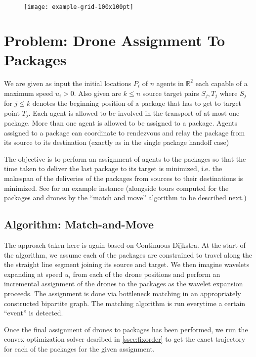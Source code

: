 \documentclass[10pt, english, oneside]{report}
\begin{document}
\begin{figure}[H]
\centering
\texttt{[image: example-grid-100x100pt]}
\end{figure}
\label{fig:multiplepho-assignment}

\section{Problem: Drone Assignment To Packages}
We are given as input the initial locations $P_i$ of $n$  agents in $\mathbb{R}^2$ 
each capable of a maximum speed $u_i >0$.
Also given are $k \leq n$ source target pairs $S_j, T_j$ where $S_j$ for $j \leq k$ 
denotes the beginning position of a package that has to get to target point $T_j$.  
Each agent is allowed to be involved in the transport of at most one package. More 
than one agent is allowed to be assigned to a package. Agents  assigned to a package 
can coordinate to rendezvous and relay the package from its source to its destination 
(exactly as in the single package handoff case)

The objective is to perform an assignment of agents to the packages so that the time 
taken to deliver the last package to its target is minimized, i.e. the makespan of 
the deliveries of the packages from sources to their destinations is minimized.  
See \label{fig:multiplepho-assignment} for an example instance (alongside tours computed
for the packages and drones by the ``match and move'' algorithm to be described next.)

\subsection{Algorithm: Match-and-Move}
\label{ssec:matchmove}

The approach taken here is again based on Continuous Dijkstra. 
At the start of the algorithm, we assume each of the packages 
are constrained to travel along the the straight line segment joining 
its source and target.  We then imagine wavelets expanding at speed $u_i$ 
from each of the drone positions and perform an incremental assignment of the 
drones to the packages as the wavelet expansion proceeds. 
The assignment is done via bottleneck matching in an appropriately 
constructed bipartite graph. The matching algorithm is run everytime 
a certain ``event'' is detected. 

Once the final assignment of drones to packages has been performed, 
we run the convex optimization solver desribed in \autoref{ssec:fixorder}
to get the exact trajectory for each of the packages for the given assignment.
\end{document}
